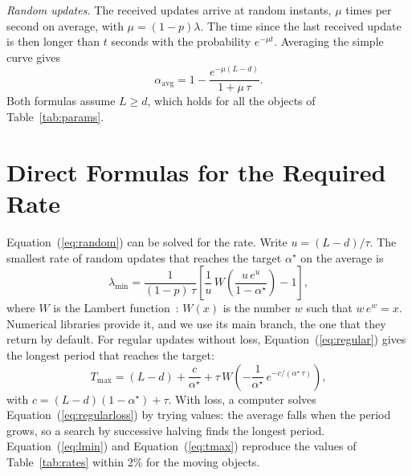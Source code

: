 \documentclass[conference]{IEEEtran}
\newcommand{\at}{\alpha^{\star}}             %
\newcommand{\aav}{\alpha_{\mathrm{avg}}}     %
\newcommand{\Eq}[1]{Equation~(\ref{#1})}     %
\begin{document}
\emph{Random updates.} The received updates arrive at random instants, $\mu$
times per second on average, with $\mu=(1-p)\lambda$. The time since the last
received update is then longer than $t$ seconds with the probability
$e^{-\mu t}$. Averaging the simple curve gives
\begin{equation}\label{eq:random}
\aav=1-\frac{e^{-\mu(L-d)}}{1+\mu\,\tau}.
\end{equation}
Both formulas assume $L\ge d$, which holds for all the objects of
Table~\ref{tab:params}.

\section{Direct Formulas for the Required Rate}\label{app:rates}

\Eq{eq:random} can be solved for the rate. Write $u=(L-d)/\tau$. The smallest
rate of random updates that reaches the target $\at$ on the average is
\begin{equation}\label{eq:lmin}
\lambda_{\min}=\frac{1}{(1-p)\,\tau}\left[\frac{1}{u}\,
W\!\left(\frac{u\,e^{u}}{1-\at}\right)-1\right],
\end{equation}
\newpage
\noindent where $W$ is the Lambert function~\cite{corless1996}: $W(x)$ is the number $w$
such that $w\,e^{w}=x$. Numerical libraries provide it, and we use its main
branch, the one that they return by default. For regular updates without
loss, \Eq{eq:regular} gives the longest period that reaches the
target:
\begin{equation}\label{eq:tmax}
T_{\max}=(L-d)+\frac{c}{\at}+\tau\,
W\!\left(-\frac{1}{\at}\,e^{-c/(\at\,\tau)}\right),
\end{equation}
with $c=(L-d)(1-\at)+\tau$. With loss, a computer solves
\Eq{eq:regularloss} by trying values: the average falls when the period grows,
so a search by successive halving finds the longest period. \Eq{eq:lmin} and \Eq{eq:tmax}
reproduce the values of Table~\ref{tab:rates} within 2\% for the moving
objects.
\end{document}
